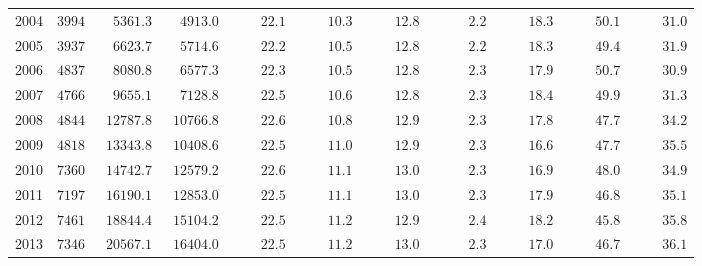 \documentclass[alpha-refs]{wiley-article-01g}
\begin{document}
\begin{table}[ht]
{\begin{tabular}{lcccccccccc}
2004  & $3994$ & $\phantom{00}5361.3$ & $\phantom{00}4913.0$ & $\phantom{0000}22.1$ & $\phantom{0000}10.3$ & $\phantom{0000}12.8$ & $\phantom{00000}2.2$ & $\phantom{0000}18.3$ & $\phantom{0000}50.1$ & $\phantom{0000}31.0$ \\
2005  & $3937$ & $\phantom{00}6623.7$ & $\phantom{00}5714.6$ & $\phantom{0000}22.2$ & $\phantom{0000}10.5$ & $\phantom{0000}12.8$ & $\phantom{00000}2.2$ & $\phantom{0000}18.3$ & $\phantom{0000}49.4$ & $\phantom{0000}31.9$ \\
2006  & $4837$ & $\phantom{00}8080.8$ & $\phantom{00}6577.3$ & $\phantom{0000}22.3$ & $\phantom{0000}10.5$ & $\phantom{0000}12.8$ & $\phantom{00000}2.3$ & $\phantom{0000}17.9$ & $\phantom{0000}50.7$ & $\phantom{0000}30.9$ \\
2007  & $4766$ & $\phantom{00}9655.1$ & $\phantom{00}7128.8$ & $\phantom{0000}22.5$ & $\phantom{0000}10.6$ & $\phantom{0000}12.8$ & $\phantom{00000}2.3$ & $\phantom{0000}18.4$ & $\phantom{0000}49.9$ & $\phantom{0000}31.3$ \\
2008  & $4844$ & $\phantom{0}12787.8$ & $\phantom{0}10766.8$ & $\phantom{0000}22.6$ & $\phantom{0000}10.8$ & $\phantom{0000}12.9$ & $\phantom{00000}2.3$ & $\phantom{0000}17.8$ & $\phantom{0000}47.7$ & $\phantom{0000}34.2$ \\
2009  & $4818$ & $\phantom{0}13343.8$ & $\phantom{0}10408.6$ & $\phantom{0000}22.5$ & $\phantom{0000}11.0$ & $\phantom{0000}12.9$ & $\phantom{00000}2.3$ & $\phantom{0000}16.6$ & $\phantom{0000}47.7$ & $\phantom{0000}35.5$ \\
2010  & $7360$ & $\phantom{0}14742.7$ & $\phantom{0}12579.2$ & $\phantom{0000}22.6$ & $\phantom{0000}11.1$ & $\phantom{0000}13.0$ & $\phantom{00000}2.3$ & $\phantom{0000}16.9$ & $\phantom{0000}48.0$ & $\phantom{0000}34.9$ \\
2011  & $7197$ & $\phantom{0}16190.1$ & $\phantom{0}12853.0$ & $\phantom{0000}22.5$ & $\phantom{0000}11.1$ & $\phantom{0000}13.0$ & $\phantom{00000}2.3$ & $\phantom{0000}17.9$ & $\phantom{0000}46.8$ & $\phantom{0000}35.1$ \\
2012  & $7461$ & $\phantom{0}18844.4$ & $\phantom{0}15104.2$ & $\phantom{0000}22.5$ & $\phantom{0000}11.2$ & $\phantom{0000}12.9$ & $\phantom{00000}2.4$ & $\phantom{0000}18.2$ & $\phantom{0000}45.8$ & $\phantom{0000}35.8$ \\
2013  & $7346$ & $\phantom{0}20567.1$ & $\phantom{0}16404.0$ & $\phantom{0000}22.5$ & $\phantom{0000}11.2$ & $\phantom{0000}13.0$ & $\phantom{00000}2.3$ & $\phantom{0000}17.0$ & $\phantom{0000}46.7$ & $\phantom{0000}36.1$ \\

\end{tabular}}
\end{table}
\end{document}
